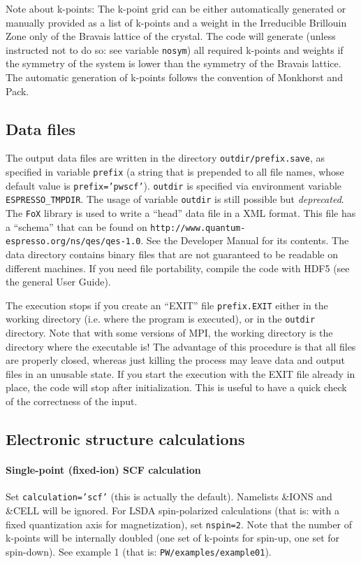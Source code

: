\documentclass[12pt,a4paper]{article}
\begin{document}
Note about k-points: The k-point grid can be either automatically generated 
or manually provided as a list of k-points and a weight in the Irreducible
Brillouin Zone only of the Bravais lattice of the crystal. The code will 
generate (unless instructed not to do so: see variable \texttt{nosym}) all
required k-points
and weights if the symmetry of the system is lower than the symmetry of the
Bravais lattice. The automatic generation of k-points follows the convention
of Monkhorst and Pack.

\subsection{Data files}

The output data files are written in the directory \texttt{outdir/prefix.save},
as specified in variable \texttt{prefix} (a string that is prepended
to all file names, whose default value is \texttt{prefix='pwscf'}).
\texttt{outdir} is specified via environment variable
\texttt{ESPRESSO\_TMPDIR}. The usage of variable \texttt{outdir} is
still possible but {\em deprecated}. The \texttt{FoX} library is used
to write a ``head'' data file in a XML format. This file has a ``schema''
that can be found on \texttt{http://www.quantum-espresso.org/ns/qes/qes-1.0}.
See the Developer Manual for its contents. The data directory contains
binary files that are not guaranteed to be readable on different machines.
If you need file portability, compile the code with HDF5 (see the general
User Guide).

The execution stops if you create an ``EXIT'' file \texttt{prefix.EXIT} either
in the working directory (i.e. where the program is executed), or in
the  \texttt{outdir} directory. Note that with some versions of MPI,
the working directory  is the directory where the executable is! 
The advantage of this procedure is that all files are properly closed, 
whereas  just killing the process may leave data and output files in 
an unusable state. If you start the execution with the EXIT file already
in place, the code will stop after initialization. This is useful to have a quick check of the correctness of the input.

\subsection{Electronic structure calculations}
\paragraph{Single-point (fixed-ion) SCF calculation} 
Set \texttt{calculation='scf'} (this is actually the default).
Namelists \&IONS and \&CELL will be ignored. For LSDA spin-polarized 
calculations (that is: with a fixed quantization axis for magnetization),
set \texttt{nspin=2}. Note that the number of k-points will be internally
doubled (one set of k-points for spin-up, one set for spin-down).
See example 1 (that is: \texttt{PW/examples/example01}).
\end{document}
